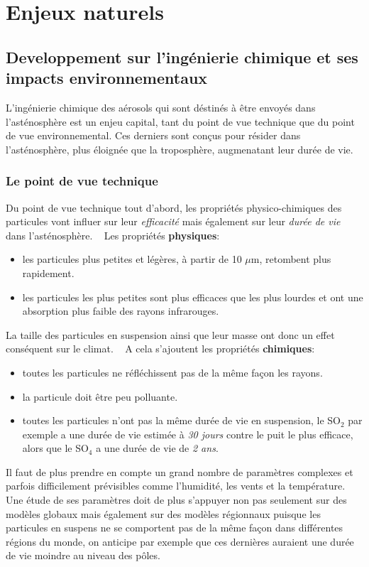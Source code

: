 \documentclass[12pt, letterpaper, twoside]{article}
\begin{document}
\section{Enjeux naturels}
\subsection{Developpement sur l'ingénierie chimique et ses impacts environnementaux}
\bigskip
L'ingénierie chimique des aérosols qui sont déstinés à être envoyés dans l'asténosphère est un enjeu capital, tant du point de vue technique que du point de vue environnemental. Ces derniers sont conçus pour résider dans l'asténosphère, plus éloignée que la troposphère, augmenatant leur durée de vie.
\subsubsection{Le point de vue technique}
Du point de vue technique tout d'abord, les propriétés physico-chimiques des particules vont influer sur leur \emph{efficacité} mais également sur leur \emph{durée de vie} dans l'asténosphère. 
\ \linebreak
Les propriétés \textbf{physiques}: 
\begin{itemize}
\item les particules plus petites et légères, à partir de 10 $\mu$m, retombent plus rapidement.
\item les particules les plus petites sont plus efficaces que les plus lourdes et ont une absorption plus faible des rayons infrarouges.
\end{itemize}
La taille des particules en suspension ainsi que leur masse ont donc un effet conséquent sur le climat.
\ \linebreak
A cela s'ajoutent les propriétés \textbf{chimiques}:
\begin{itemize}
\item toutes les particules ne réfléchissent pas de la même façon les rayons.
\item la particule doit être peu polluante.
\item toutes les particules n'ont pas la même durée de vie en suspension, le SO$_2$ par exemple a une durée de vie estimée à \emph{30 jours} contre le puit le plus efficace, alors que le SO$_4$ a une durée de vie de \emph{2 ans}.
\end{itemize}
Il faut de plus prendre en compte un grand nombre de paramètres complexes et parfois difficilement prévisibles comme l'humidité, les vents et la température. Une étude de ses paramètres doit de plus s'appuyer non pas seulement sur des modèles globaux mais également sur des modèles régionnaux puisque les particules en suspens ne se comportent pas de la même façon dans différentes régions du monde, on anticipe par exemple que ces dernières auraient une durée de vie moindre au niveau des pôles. 
\end{document}
